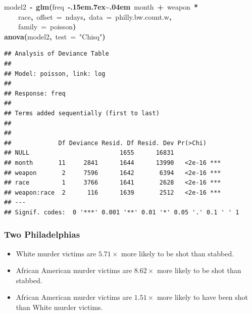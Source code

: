 \documentclass[]{beamer}
\makeatletter
\newcommand{\hlfunctioncall}[1]{\textcolor[rgb]{.5,0,.33}{\textbf{#1}}}%
\newcommand{\hlstring}[1]{\textcolor[rgb]{.6,.6,1}{#1}}%
\newcommand{\hlkeyword}[1]{\textbf{#1}}%
\newcommand{\hlargument}[1]{\textcolor[rgb]{.69,.25,.02}{#1}}%
\newcommand{\hlassignement}[1]{\textbf{#1}}%
\newcommand{\hlsymbol}[1]{#1}%
\def\urltilda{\kern -.15em\lower .7ex\hbox{\~{}}\kern .04em}%
\newcommand{\hlstd}[1]{\textcolor[rgb]{0,0,0}{#1}}%
\newenvironment{kframe}{%
 \def\FrameCommand##1{\hskip\@totalleftmargin \hskip-\fboxsep
 \colorbox{shadecolor}{##1}\hskip-\fboxsep
     \hskip-\linewidth \hskip-\@totalleftmargin \hskip\columnwidth}%
 \MakeFramed {\advance\hsize-\width
   \@totalleftmargin\z@ \linewidth\hsize
   \@setminipage}}%
 {\par\unskip\endMakeFramed}
\newenvironment{knitrout}{}{} %
\renewenvironment{knitrout}{\begin{footnotesize}}{\end{footnotesize}}
\makeatother
\begin{document}
\begin{frame}[fragile]
\begin{knitrout}
\color{fgcolor}\begin{kframe}
\begin{flushleft}
\ttfamily\noindent
\hlsymbol{model2}{\ }\hlassignement{\usebox{\hlnormalsizeboxlessthan}-}{\ }\hlfunctioncall{glm}\hlkeyword{(}\hlsymbol{freq}{\ }\hlkeyword{\urltilda{}}{\ }\hlsymbol{month}{\ }\hlkeyword{+}{\ }\hlsymbol{weapon}{\ }\hlkeyword{*}\hspace*{\fill}\\
\hlstd{}{\ }{\ }{\ }{\ }\hlsymbol{race}\hlkeyword{,}{\ }\hlargument{offset}{\ }\hlargument{=}{\ }\hlsymbol{ndays}\hlkeyword{,}{\ }\hlargument{data}{\ }\hlargument{=}{\ }\hlsymbol{philly.bw.count.w}\hlkeyword{,}\hspace*{\fill}\\
\hlstd{}{\ }{\ }{\ }{\ }\hlargument{family}{\ }\hlargument{=}{\ }\hlsymbol{poisson}\hlkeyword{)}\hspace*{\fill}\\
\hlstd{}\hlfunctioncall{anova}\hlkeyword{(}\hlsymbol{model2}\hlkeyword{,}{\ }\hlargument{test}{\ }\hlargument{=}{\ }\hlstring{"{}Chisq"{}}\hlkeyword{)}\mbox{}
\normalfont
\end{flushleft}
\begin{verbatim}
## Analysis of Deviance Table
## 
## Model: poisson, link: log
## 
## Response: freq
## 
## Terms added sequentially (first to last)
## 
## 
##             Df Deviance Resid. Df Resid. Dev Pr(>Chi)    
## NULL                         1655      16831             
## month       11     2841      1644      13990   <2e-16 ***
## weapon       2     7596      1642       6394   <2e-16 ***
## race         1     3766      1641       2628   <2e-16 ***
## weapon:race  2      116      1639       2512   <2e-16 ***
## ---
## Signif. codes:  0 '***' 0.001 '**' 0.01 '*' 0.05 '.' 0.1 ' ' 1 
\end{verbatim}
\end{kframe}
\end{knitrout}

\end{frame}

\begin{frame}
\frametitle{Two Philadelphias}
 \begin{itemize}
 	\item White murder victims are 
 		$5.71\times$ 
 		more likely to be shot than stabbed.
 	 	\item African American murder victims are 
 			$8.62\times$
 			more likely to be shot than stabbed.
 	\item African American murder victims are 
 			$1.51\times$
 			more likely to have been shot than White murder victims.
 \end{itemize}
\end{frame}
\end{document}
